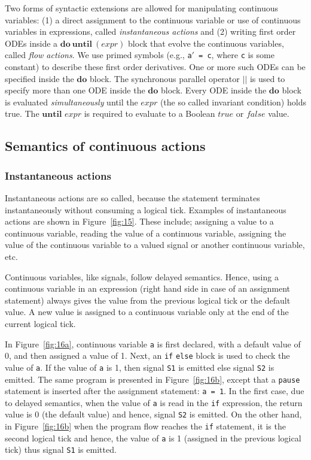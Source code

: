\documentclass[10pt,journal,cspaper,compsoc]{IEEEtran}
\begin{document}
Two forms of syntactic extensions are allowed for manipulating
continuous variables: (1) a direct assignment to the continuous variable
or use of continuous variables in expressions, called
\textit{instantaneous actions} and (2) writing first order ODEs inside a
$\mathbf{do}\ \mathbf{until}\ (expr)$ block that evolve the continuous
variables, called \textit{flow actions}. We use primed symbols (e.g.,
\mbox{\texttt{a$'$ = c}}, where \texttt{c} is some constant) to describe
these first order derivatives. One or more such ODEs can be specified
inside the $\mathbf{do}$ block. The synchronous parallel operator $||$
is used to specify more than one ODE inside the $\mathbf{do}$
block. Every ODE inside the $\mathbf{do}$ block is evaluated
\textit{simultaneously} until the $expr$ (the so called invariant
condition) holds true. The $\mathbf{until}$ $expr$ is required to
evaluate to a Boolean $true$ or $false$ value.

\subsection{Semantics of continuous actions}
\label{sec:semant-cont-acti}



\subsubsection{Instantaneous actions}
\label{sec:inst-acti}

Instantaneous actions are so called, because the statement terminates
instantaneously without consuming a logical tick. Examples of
instantaneous actions are shown in Figure~\ref{fig:15}. These include;
assigning a value to a continuous variable, reading the value of a
continuous variable, assigning the value of the continuous variable to a
valued signal or another continuous variable, etc.

Continuous variables, like signals, follow delayed semantics. Hence,
using a continuous variable in an expression (right hand side in case of
an assignment statement) always gives the value from the previous
logical tick or the default value. A new value is assigned to a
continuous variable only at the end of the current logical tick. 

In Figure~\ref{fig:16a}, continuous variable \texttt{a} is first
declared, with a default value of 0, and then assigned a value of
1. Next, an \texttt{if} \texttt{else} block is used to check the value
of \texttt{a}. If the value of \texttt{a} is 1, then signal \texttt{S1}
is emitted else signal \texttt{S2} is emitted. The same program is
presented in Figure~\ref{fig:16b}, except that a \texttt{pause}
statement is inserted after the assignment statement: \texttt{a = 1}.
In the first case, due to delayed semantics, when the value of
\texttt{a} is read in the \texttt{if} expression, the return value is 0
(the default value) and hence, signal \texttt{S2} is emitted. On the
other hand, in Figure~\ref{fig:16b} when the program flow reaches the
\texttt{if} statement, it is the second logical tick and hence, the
value of \texttt{a} is 1 (assigned in the previous logical tick) thus
signal \texttt{S1} is emitted.
\end{document}
